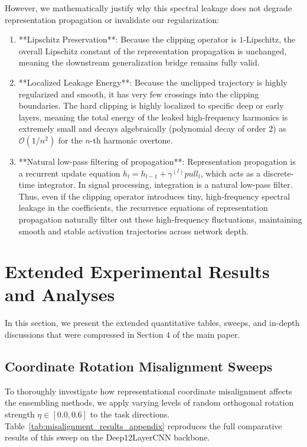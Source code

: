 However, we mathematically justify why this spectral leakage does not degrade representation propagation or invalidate our regularization:
\begin{enumerate}
    \item **Lipschitz Preservation**: Because the clipping operator is $1$-Lipschitz, the overall Lipschitz constant of the representation propagation is unchanged, meaning the downstream generalization bridge remains fully valid.
    \item **Localized Leakage Energy**: Because the unclipped trajectory is highly regularized and smooth, it has very few crossings into the clipping boundaries. The hard clipping is highly localized to specific deep or early layers, meaning the total energy of the leaked high-frequency harmonics is extremely small and decays algebraically (polynomial decay of order 2) as $\mathcal{O}(1/n^2)$ for the $n$-th harmonic overtone.
    \item **Natural low-pass filtering of propagation**: Representation propagation is a recurrent update equation $h_l = h_{l-1} + \gamma^{(l)} pull_l$, which acts as a discrete-time integrator. In signal processing, integration is a natural low-pass filter. Thus, even if the clipping operator introduces tiny, high-frequency spectral leakage in the coefficients, the recurrence equations of representation propagation naturally filter out these high-frequency fluctuations, maintaining smooth and stable activation trajectories across network depth.
\end{enumerate}


\newpage
\section{Extended Experimental Results and Analyses}
\label{sec:appendix_experiments}

In this section, we present the extended quantitative tables, sweeps, and in-depth discussions that were compressed in Section 4 of the main paper.

\subsection{Coordinate Rotation Misalignment Sweeps}
\label{sec:appendix_misalignment}

To thoroughly investigate how representational coordinate misalignment affects the ensembling methods, we apply varying levels of random orthogonal rotation strength $\eta \in [0.0, 0.6]$ to the task directions. Table~\ref{tab:misalignment_results_appendix} reproduces the full comparative results of this sweep on the Deep12LayerCNN backbone.

